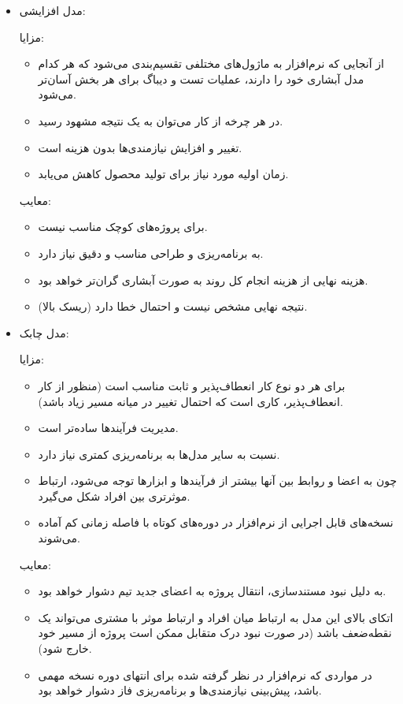 {\begin{itemize}
\item مدل افزایشی:

مزایا:

\begin{itemize}
\item 
از آنجایی که نرم‌افزار به ماژول‌های مختلفی تقسیم‌بندی می‌شود که هر کدام مدل آبشاری خود را دارند، عملیات تست و دیباگ برای هر بخش آسان‌تر می‌شود.
\item
 در هر چرخه از کار می‌توان به یک نتیجه مشهود رسید.
\item
 تغییر و افزایش نیازمندی‌ها بدون هزینه است.
\item
 زمان اولیه مورد نیاز برای تولید محصول کاهش می‌یابد. 
\end{itemize}

معایب:
\begin{itemize}
\item 

برای پروژه‌های کوچک مناسب نیست.
\item
به برنامه‌ریزی و طراحی مناسب و دقیق نیاز دارد.
\item
هزینه نهایی از هزینه انجام کل روند به صورت آبشاری گران‌تر خواهد بود.
\item
نتیجه نهایی مشخص نیست و احتمال خطا دارد (ریسک بالا).
\end{itemize}
\item مدل چابک:

مزایا:
\begin{itemize}
\item 

برای هر دو نوع کار انعطاف‌پذیر و ثابت مناسب است (منظور از کار انعطاف‌پذیر، کاری است که احتمال تغییر در میانه مسیر زیاد باشد).
\item
 مدیریت فرآیندها ساده‌تر است.
\item
 نسبت به سایر مدل‌ها به برنامه‌ریزی کمتری نیاز دارد.
\item
 چون به اعضا و روابط بین آنها بیشتر از فرآیند‌ها و ابزارها توجه می‌شود، ارتباط موثرتری بین افراد شکل می‌گیرد.
\item
 نسخه‌های قابل اجرایی از نرم‌افزار در دوره‌های کوتاه با فاصله زمانی کم آماده می‌شوند. 
\end{itemize}

معایب:
\begin{itemize}
\item
به دلیل نبود مستند‌سازی، انتقال پروژه به اعضای جدید تیم دشوار خواهد بود.
\item
اتکای بالای این مدل به ارتباط میان افراد و ارتباط موثر با مشتری می‌تواند یک نقطه‌ضعف باشد (در صورت نبود درک متقابل ممکن است پروژه از مسیر خود خارج شود).
\item
در مواردی که نرم‌افزار در نظر گرفته شده برای انتهای دوره نسخه مهمی باشد، پیش‌بینی نیازمندی‌ها و برنامه‌ریزی فاز دشوار خواهد بود.  
\end{itemize}
 

\end{itemize}}
